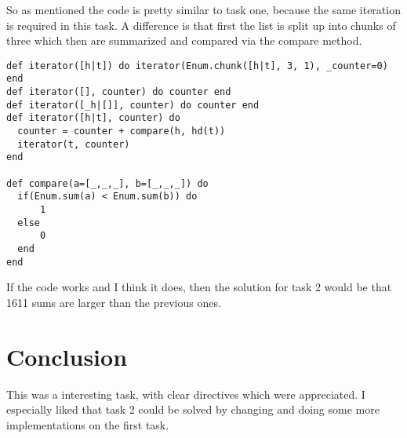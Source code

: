 \documentclass[a4paper,11pt]{article}
\begin{document}
So as mentioned the code is pretty similar to task one, because the same iteration is required in this task. A difference is that first the list is split up into chunks of three which then are summarized and compared via the compare method.
\begin{verbatim}
def iterator([h|t]) do iterator(Enum.chunk([h|t], 3, 1), _counter=0) end
def iterator([], counter) do counter end
def iterator([_h|[]], counter) do counter end
def iterator([h|t], counter) do
  counter = counter + compare(h, hd(t))
  iterator(t, counter)
end

def compare(a=[_,_,_], b=[_,_,_]) do
  if(Enum.sum(a) < Enum.sum(b)) do
      1
  else
      0
  end
end
\end{verbatim}

If the code works and I think it does, then the solution for task 2 would be that 1611 sums are larger than the previous ones.

\section{Conclusion}
This was a interesting task, with clear directives which were appreciated. I especially liked that task 2 could be solved by changing and doing some more implementations on the first task.
\end{document}
